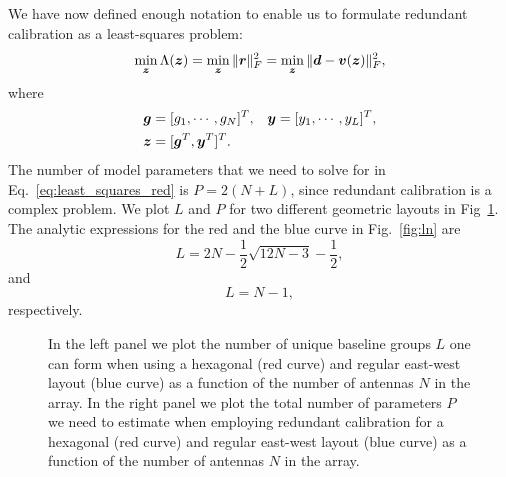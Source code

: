 \documentclass[useAMS,usenatbib]{mn2e}
\newcommand{\bz}{\bmath{z}}
\newcommand{\br}{\bmath{r}}
\newcommand{\bg}{\bmath{g}}
\newcommand{\bd}{\bmath{d}}
\newcommand{\bv}{\bmath{v}}
\newcommand{\by}{\bmath{y}}
\begin{document}
We have now defined enough notation to enable us to formulate redundant calibration as a least-squares problem:
\begin{equation}
\label{eq:least_squares_red}
\min_{\bz} \Lambda(\bz) = \min_{\bz} \|\br\|_F^2 = \min_{\bz} \|\bd - \bv(\bz)\|_F^2, 
\end{equation}
where
\begin{align}
 \bg &=[g_1,\cdots,g_N]^T, & \by &= [y_1,\cdots,y_L]^T,\nonumber\\
 \bz &= [\bg^T,\by^T]^T. &  &\label{eq:parm_definitions}
 \end{align}
The number of model parameters that we need to solve for in Eq.~\eqref{eq:least_squares_red} is $P = 2(N+L)$, since redundant calibration is a complex problem.
We plot $L$ and $P$ for two different geometric layouts in Fig~\ref{fig:pl}.
The analytic expressions for the red and the blue curve in Fig.~\ref{fig:ln} are
\begin{equation}
L = 2N-\frac{1}{2}\sqrt{12N-3}-\frac{1}{2}, 
\end{equation}
and
\begin{equation}
L = N - 1, 
\end{equation}
respectively.

\begin{figure}
\centering
{}
\caption{In the left panel we plot the number of unique baseline groups $L$ one can form when using a hexagonal (red curve) and regular east-west layout (blue curve) as 
a function of the number of antennas $N$ in the array. In the right panel we plot the total number of parameters $P$ we need to estimate when employing redundant calibration for a hexagonal (red curve) and regular east-west layout (blue curve) as 
a function of the number of antennas $N$ in the array. 
\label{fig:pl}} 
\end{figure}
\end{document}
